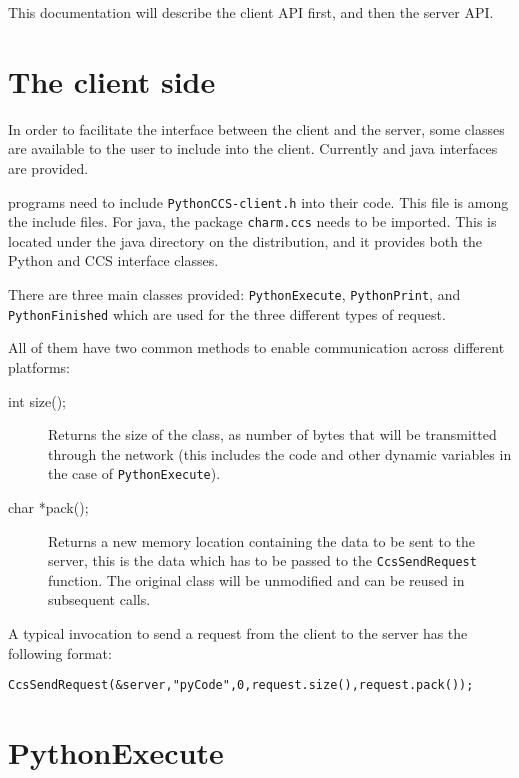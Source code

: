 This documentation will describe the client API first, and then the server API. 


\section{The client side}

\label{pythonClient}

In order to facilitate the interface between the client and the server, some
classes are available to the user to include into the client. Currently \CC{} and
java interfaces are provided.

\CC{} programs need to include \texttt{PythonCCS-client.h} into their
code. This file is among the \charmpp{} include files. For java, the package
\texttt{charm.ccs} needs to be imported. This is located under the java
directory on the \charmpp{} distribution, and it provides both the Python and
CCS interface classes.

There are three main classes provided: \texttt{PythonExecute},
\texttt{PythonPrint}, and \texttt{PythonFinished} which are used for the three
different types of request.

All of them have two common methods to enable communication across different platforms:

\begin{description}

\item[int size();]
Returns the size of the class, as number of bytes that will be
transmitted through the network (this includes the code and other dynamic
variables in the case of \texttt{PythonExecute}).

\item[char *pack();]
Returns a new memory location containing the data to be sent to the server, this
is the data which has to be passed to the \texttt{CcsSendRequest} function. The
original class will be unmodified and can be reused in subsequent calls.

\end{description}

A typical invocation to send a request from the client to the server has the
following format:

\begin{alltt}
CcsSendRequest (&server, "pyCode", 0, request.size(), request.pack());
\end{alltt}

\section{PythonExecute}
\label{pythonExecute}

